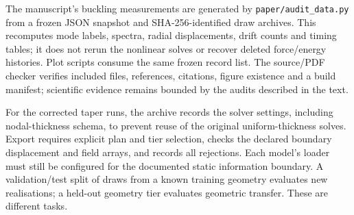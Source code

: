 The manuscript's buckling measurements are generated by
\texttt{paper/audit\_data.py} from a frozen JSON snapshot and SHA-256-identified
draw archives. This recomputes mode labels, spectra, radial displacements,
drift counts and timing tables; it does not rerun the nonlinear solves or
recover deleted force/energy histories. Plot scripts consume the same frozen
record list. The source/PDF checker verifies included files, references,
citations, figure existence and a build manifest; scientific evidence remains
bounded by the audits described in the text.

For the corrected taper runs, the archive records the solver settings,
including nodal-thickness schema, to prevent reuse of the original
uniform-thickness solves. Export requires explicit plan and tier selection,
checks the declared boundary displacement and field arrays, and records all
rejections. Each model's loader must still be configured for the documented
static information boundary. A validation/test split of draws from a known
training geometry evaluates new realisations; a held-out geometry tier
evaluates geometric transfer. These are different tasks.
